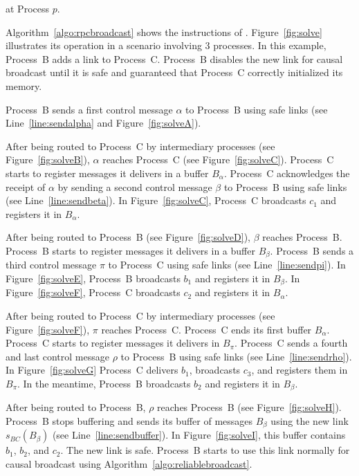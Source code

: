 \begin{algorithm}[h]
  
  \caption{\label{algo:rpcbroadcast}\RPCBROADCAST at Process $p$.}
\end{algorithm}


Algorithm~\ref{algo:rpcbroadcast} shows the instructions of \RPCBROADCAST.
Figure~\ref{fig:solve} illustrates its operation in a scenario involving 3
processes. In this example, Process~B adds a link to Process~C. Process~B
disables the new link for causal broadcast until it is safe and guaranteed that
Process~C correctly initialized its memory.

\noindent Process~B sends a first control message $\alpha$ to Process~B using
safe links (see Line~\ref{line:sendalpha} and Figure~\ref{fig:solveA}).

\noindent After being routed to Process~C by intermediary processes (see
Figure~\ref{fig:solveB}), $\alpha$ reaches Process~C (see
Figure~\ref{fig:solveC}).  Process~C starts to register messages it delivers in
a buffer $B_\alpha$.  Process~C acknowledges the receipt of $\alpha$ by sending
a second control message $\beta$ to Process~B using safe links (see
Line~\ref{line:sendbeta}). In Figure~\ref{fig:solveC}, Process~C broadcasts
$c_1$ and registers it in $B_\alpha$.

\noindent After being routed to Process~B (see Figure~\ref{fig:solveD}), $\beta$
reaches Process~B. Process~B starts to register messages it delivers in a buffer
$B_\beta$. Process~B sends a third control message $\pi$ to Process~C using safe
links (see Line~\ref{line:sendpi}). In Figure~\ref{fig:solveE}, Process~B
broadcasts $b_1$ and registers it in $B_\beta$. In Figure~\ref{fig:solveF},
Process~C broadcasts $c_2$ and registers it in $B_\alpha$.

\noindent After being routed to Process~C by intermediary processes (see
Figure~\ref{fig:solveF}), $\pi$ reaches Process~C. Process~C ends its first
buffer $B_\alpha$.  Process~C starts to register messages it delivers in
$B_\pi$.  Process~C sends a fourth and last control message $\rho$ to Process~B
using safe links (see Line~\ref{line:sendrho}). In Figure~\ref{fig:solveG}
Process~C delivers $b_1$, broadcasts $c_3$, and registers them in $B_\pi$. In
the meantime, Process~B broadcasts $b_2$ and registers it in $B_\beta$.

\noindent After being routed to Process~B, $\rho$ reaches Process~B (see
Figure~\ref{fig:solveH}).  Process~B stops buffering and sends its buffer of
messages $B_\beta$ using the new link $s_{BC}(B_\beta)$ (see
Line~\ref{line:sendbuffer}). In Figure~\ref{fig:solveI}, this buffer contains
$b_1$, $b_2$, and $c_2$. The new link is safe. Process~B starts to use this link
normally for causal broadcast using Algorithm~\ref{algo:reliablebroadcast}.

